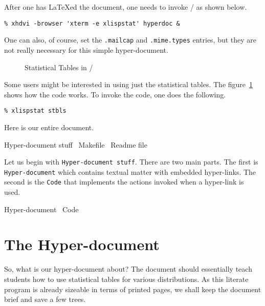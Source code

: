 After one has \LaTeX{}ed the document, one needs to invoke \xhdvi/ as
shown below.
\begin{verbatim}
% xhdvi -browser 'xterm -e xlispstat' hyperdoc &
\end{verbatim}
One can also, of course, set the {\tt .mailcap} and {\tt .mime.types}
entries, but they are not really necessary for this simple
hyper-document.

\begin{figure}[hbtp]
  \begin{center}
    \leavevmode
      \epsfxsize=3in
      \epsfysize=3in
  \end{center}
  \caption{Statistical Tables in \xls/}
  \label{fig:example}
\end{figure}

Some users might be interested in using just the statistical tables. 
The figure~\ref{fig:example} shows how the code works. To invoke the code,
one does the following.
\begin{verbatim}
% xlispstat stbls
\end{verbatim}

Here is our entire document.

\nwenddocs{}\endmoddef
\LA{}Hyper-document stuff~{\nwtagstyle{}}\RA{}
\LA{}Makefile~{\nwtagstyle{}}\RA{}
\LA{}Readme file~{\nwtagstyle{}}\RA{}
\nwendcode{}\nwdocspar

Let us begin with {\tt{}Hyper-document\ stuff}. There are two main
parts. The first is {\tt{}Hyper-document} which contains textual matter
with embedded hyper-links. The second is the {\tt{}Code} that implements
the actions invoked when a hyper-link is used.

\nwenddocs{}\endmoddef
\LA{}Hyper-document~{\nwtagstyle{}}\RA{}
\LA{}Code~{\nwtagstyle{}}\RA{}
\nwendcode{}\nwdocspar

\section{The Hyper-document}
\label{sec:hyper-doc}
So, what is our hyper-document about? The document should essentially
teach students how to use statistical tables for various
distributions. As this literate program is already sizeable in terms
of printed pages, we shall keep the document brief and save a few
trees.

